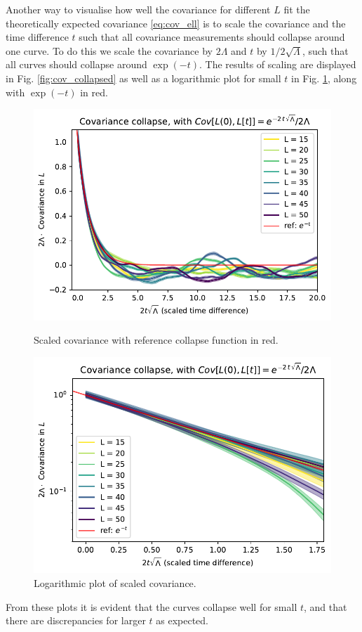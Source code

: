 Another way to visualise how well the covariance for different $L$ fit the theoretically expected covariance \eqref{eq:cov_ell} is to scale the covariance and the time difference $t$ such that all covariance measurements should collapse around one curve.
To do this we scale the covariance by $2\Lambda$ and $t$ by $1/2\sqrt{\Lambda}$, such that all curves should collapse around $\exp(-t)$.
The results of scaling are displayed in Fig. \ref{fig:cov_collapsed} as well as a logarithmic plot for small $t$ in Fig. \ref{fig:cov_log_collapsed}, along with $\exp(-t)$ in red.
\begin{figure}[ht]
    \begin{minipage}[t]{0.49\linewidth}
        \centering
        \includegraphics[width=\linewidth]{img/cov_collapsed.pdf}
        \caption{Scaled covariance with reference collapse function in red.}
        \label{fig:cov_collapsed}
    \end{minipage}
    \hfill
    \begin{minipage}[t]{0.49\linewidth}
        \centering
        \includegraphics[width=\linewidth]{img/cov_collapsed_log.pdf}
        \caption{Logarithmic plot of scaled covariance.}
        \label{fig:cov_log_collapsed}
    \end{minipage}
\end{figure}
From these plots it is evident that the curves collapse well for small $t$, and that there are discrepancies for larger $t$ as expected.



